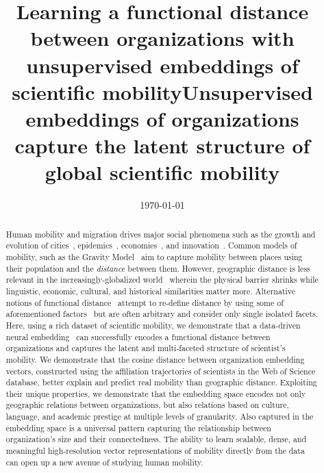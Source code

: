 \documentclass[12pt]{article} %
\begin{document}
\title{Learning a functional distance between organizations with unsupervised embeddings of scientific mobility}
\title{Unsupervised embeddings of organizations capture the latent structure of global scientific mobility} %
\date{\today}
\maketitle %

%
%

\begin{abstract}


Human mobility and migration drives major social phenomena such as the growth and evolution of cities~\autocite{wef2017migration, curiel2018citygravity},  epidemics~\autocite{kraemer2020covid, truscott2012epidemicgravity, xia2005measlesgravity}, economies~\autocite{kaluza2010cargo, kerr2011immigration}, and innovation~\autocite{kaiser2018innovation, armano2017innovation, sugimoto2017mostimpact, petersen2018multiscale, franzoni2014advantage}.
Common models of mobility, such as the Gravity Model~\autocite{zipf1946gravity} aim to capture mobility between places using their population and the \textit{distance} between them.
However, geographic distance is less relevant in the increasingly-globalized world~\autocite{czaika2018migration, czaika2018globalisation, buchan2009globalization, altbach2004globalization} wherein the physical barrier shrinks while linguistic, economic, cultural, and historical similarities matter more.
Alternative notions of functional distance~\autocite{brown1970migration, brown1970functional, kim2018functional} attempt to re-define distance by using some of aforementioned factors~\autocite{boschma2005proximity,  brown1970functional, brown1970migration, kim2018functional} but are often arbitrary and consider only single isolated facets.
Here, using a rich dataset of scientific mobility, we demonstrate that a data-driven neural embedding~\autocite{mikolov2013word2vec} can successfully encodes a functional distance between organizations and captures the latent and multi-faceted structure of scientist's mobility.
We demonstrate that the cosine distance between organization embedding vectors, constructed using the affiliation trajectories of scientists in the Web of Science database, better explain and predict real mobility than geographic distance.
Exploiting their unique properties, we demonstrate that the embedding space encodes not only geographic relations between organizations, but also relations based on culture, language, and academic prestige at multiple levels of granularity.
Also captured in the embedding space is a universal pattern capturing the relationship between organization's size and their connectedness.
The ability to learn scalable, dense, and meaningful high-resolution vector representations of mobility directly from the data can open up a new avenue of studying human mobility.

\end{abstract}
\end{document}
